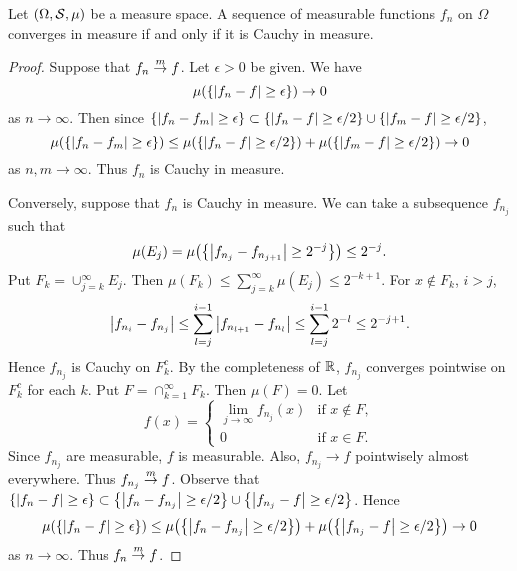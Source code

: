 \begin{theorem}
    Let $(\Omega, \S, \mu)$ be a measure space. A sequence of measurable functions 
    $f_n$ on $\Omega$ converges in measure if and only if it is Cauchy in measure.
\end{theorem}
\begin{proof}
    Suppose that $f_n\mto f$. Let $\epsilon>0$ be given. We have 
    \begin{equation*}
        \mu\pth{\set{\abs{f_n-f}\geq \epsilon}} \to 0
    \end{equation*}
    as $n\to\infty$. Then since $\set{\abs{f_n-f_m}\geq\epsilon} 
    \subset\set{\abs{f_n-f}\geq\epsilon/2}\cup\set{\abs{f_m-f}\geq\epsilon/2}$, 
    \begin{equation*}
        \mu\pth{\set{\abs{f_n-f_m}\geq\epsilon}} \leq \mu\pth{\set{\abs{f_n-f}\geq\epsilon/2}} 
        + \mu\pth{\set{\abs{f_m-f}\geq\epsilon/2}} \to 0
    \end{equation*}
    as $n,m\to\infty$. Thus $f_n$ is Cauchy in measure. 

    Conversely, suppose that $f_n$ is Cauchy in measure. We can take a subsequence 
    $f_{n_j}$ such that 
    \begin{equation*}
        \mu(E_j) = \mu\pth{\set{\abs{f_{n_j}-f_{n_{j+1}}}\geq 2^{-j}}}\leq 2^{-j}.
    \end{equation*}
    Put $F_k = \cup_{j=k}^\infty E_j$. Then $\mu(F_k)\leq \sum_{j=k}^{\infty}\mu(E_j)\leq 2^{-k+1}$. 
    For $x\notin F_k$, $i>j$, 
    \begin{equation*}
        \abs{f_{n_i}-f_{n_j}} \leq \sum_{l=j}^{i-1}\abs{f_{n_{l+1}}-f_{n_l}} \leq \sum_{l=j}^{i-1} 2^{-l} \leq 2^{-j+1}.
    \end{equation*}
    Hence $f_{n_j}$ is Cauchy on $F_k^c$. By the completeness of $\R$, $f_{n_j}$ 
    converges pointwise on $F_k^c$ for each $k$. Put $F = \cap_{k=1}^\infty F_k$. 
    Then $\mu(F) = 0$. Let 
    \begin{equation*}
        f(x) = \begin{cases}
            \lim_{j\to\infty} f_{n_j}(x) &\text{if } x\notin F,\\
            0 &\text{if } x\in F.
        \end{cases}
    \end{equation*}
    Since $f_{n_j}$ are measurable, $f$ is measurable. Also, $f_{n_j}\to f$ 
    pointwisely almost everywhere. Thus $f_{n_j}\mto f$. Observe that 
    $\set{\abs{f_n-f}\geq\epsilon}\subset\set{\abs{f_n-f_{n_j}}\geq\epsilon/2}\cup\set{\abs{f_{n_j}-f}\geq\epsilon/2}$. 
    Hence 
    \begin{equation*}
        \mu(\set{\abs{f_n-f}\geq\epsilon}) \leq \mu\pth{\set{\abs{f_n-f_{n_j}}\geq\epsilon/2}} 
        + \mu\pth{\set{\abs{f_{n_j}-f}\geq\epsilon/2}} \to 0 
    \end{equation*}
    as $n\to\infty$. Thus $f_n\mto f$.
\end{proof}

